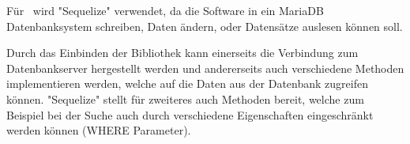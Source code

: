 
Für \ZELIA\ wird "Sequelize" verwendet, da die Software in ein MariaDB Datenbanksystem schreiben, Daten ändern, oder Datensätze auslesen können soll.

Durch das Einbinden der Bibliothek kann einerseits die Verbindung zum Datenbankserver hergestellt werden und andererseits auch verschiedene Methoden implementieren werden, welche auf die Daten aus der Datenbank zugreifen können. "Sequelize" stellt für zweiteres auch Methoden bereit, welche zum Beispiel bei der Suche auch durch verschiedene Eigenschaften eingeschränkt werden können (WHERE Parameter).






